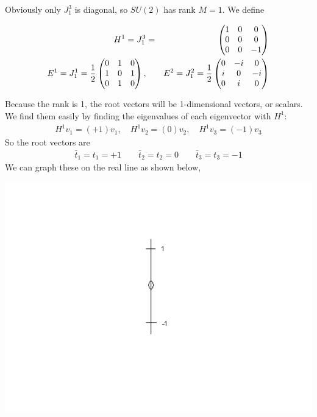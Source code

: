 \documentclass[12pt,epsf]{article}
\def\nolabel{\nonumber }
\def\nolabel{\nonumber }
\begin{document}
Obviously only $J^3_1$ is diagonal, so $SU(2)$ has rank $M =1$.  We
define

\begin{eqnarray}
H^1 = J^3_1 &=& \begin{pmatrix}
1 & 0 & 0 \\ 0 & 0 & 0 \\ 0 & 0 & -1 \end{pmatrix}\nolabel \\
E^1 = J^1_1 = {1\over 2}
\begin{pmatrix}
0 & 1 & 0 \\ 1 & 0 & 1 \\ 0 & 1 & 0 
\end{pmatrix}, &\quad& E^2 = J^2_1 = {1\over2}
\begin{pmatrix}
0 & -i & 0 \\ i & 0 & -i \\ 0 & i & 0
\end{pmatrix}\nolabel
\end{eqnarray}

Because the rank is 1, the root vectors will be 1-dimensional
vectors, or scalars.  We find them easily by finding the eigenvalues of
each eigenvector with $H^1$:
\begin{eqnarray}
H^1v_1 = (+1)v_1, \quad H^1v_2 = (0)v_2,\quad H^1v_3 = (-1)v_3\nolabel
\end{eqnarray}
So the root vectors are
\begin{eqnarray}
\bar t_1 = t_1 = +1 \qquad \bar t_2 = t_2 = 0 \qquad \bar t_3 = t_3 =
-1 \label{eq:rootvectorsare}
\end{eqnarray}
We can graph these on the real line as shown below,
\begin{center}
\includegraphics[scale = .7]{su2raiselower.PNG} \label{su2picture}
\end{center}
\end{document}
